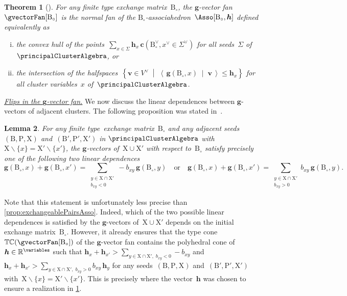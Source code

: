 \documentclass{amsart}
\newtheorem{theorem}{Theorem}[section]
\newtheorem{lemma}[theorem]{Lemma}
\theoremstyle{definition}
\newcommand{\R}{\mathbb{R}} %
\renewcommand{\b}[1]{{\boldsymbol{#1}}} %
\newcommand{\set}[2]{\left\{ #1 \;\middle|\; #2 \right\}} %
\newcommand{\ssm}{\smallsetminus} %
\newcommand{\dotprod}[2]{\left\langle \, #1 \; \middle| \; #2 \, \right\rangle} %
\newcommand{\darkblue}{\color{darkblue}} %
\newcommand{\defn}[1]{\textsl{\darkblue #1}} %
\newcommand{\para}[1]{\medskip\noindent\uline{\textit{#1.}}} %
\newcommand{\gvectorFull}[2]{\b{g}(#1,#2)} %
\newcommand{\cvectorFull}[3]{\mathbf{c}(#1,#3 \in #2)} %
\newcommand{\typeCone}{\mathbb{TC}} %
\newcommand{\seed}{\Sigma} %
\newcommand{\cluster}{\mathrm{X}} %
\newcommand{\coefficients}{\mathrm{P}} %
\newcommand{\B}{\mathrm{B}} %
\begin{document}
\begin{theorem}[{\cite[Thm.~26]{HohlwegPilaudStella}}]
\label{thm:generalizedAsso}
For any finite type exchange matrix~$\B_\circ$, the $\b{g}$-vector fan~$\gvectorFan[\B_\circ]$ is the normal fan of the \defn{$\B_\circ$-associahedron}~$\Asso[\B_\circ, \b{h}]$ defined equivalently as
\begin{enumerate}[(i)]
\item the convex hull of the points~$\sum_{x \in \seed} \b{h}_x \, \cvectorFull{\B_\circ^\vee}{\seed^\vee}{x^\vee}$ for all seeds~$\seed$ of~$\principalClusterAlgebra$, or
\item the intersection of the halfspaces~$\set{\b{v} \in V^\vee}{\dotprod{\gvectorFull{\B_\circ}{x}}{\b{v}} \le \b{h}_x}$ for all cluster variables~$x$ of~$\principalClusterAlgebra$.
\end{enumerate}
\end{theorem}

\para{Flips in the $\b{g}$-vector fan}
%
We now discuss the linear dependences between $\b{g}$-vectors of adjacent clusters.
The following proposition was stated in~\cite[Lem.~19]{HohlwegPilaudStella}.

\begin{lemma}
\label{lem:linearDependencegvectorsCA}
For any finite type~exchange matrix~$\B_\circ$ and any adjacent seeds~${(\B, \coefficients, \cluster)}$ and~${(\B', \coefficients', \cluster')}$ in $\principalClusterAlgebra$ with~$\cluster \ssm \{x\} = \cluster' \ssm \{x'\}$, the $\b{g}$-vectors of~$\cluster \cup \cluster'$ with respect to~$\B_\circ$ satisfy precisely one of the following two linear dependences
\[
\gvectorFull{\B_\circ}{x} + \gvectorFull{\B_\circ}{x'} = \sum_{\substack{y \in \cluster \cap \cluster' \\ b_{xy} < 0}} -b_{xy} \, \gvectorFull{\B_\circ}{y}
\quad\text{or}\quad
\gvectorFull{\B_\circ}{x} + \gvectorFull{\B_\circ}{x'} = \sum_{\substack{y \in \cluster \cap \cluster' \\ b_{xy} > 0}} b_{xy} \, \gvectorFull{\B_\circ}{y}.
\]
\end{lemma}

Note that this statement is unfortunately less precise than \cref{prop:exchangeablePairsAsso}. Indeed, which of the two possible linear dependences is satisfied by the $\b{g}$-vectors of~$\cluster \cup \cluster'$ depends on the initial exchange matrix~$\B_\circ$.
However, it already ensures that the type cone~$\typeCone(\gvectorFan[\B_\circ])$ of the $\b{g}$-vector fan contains the polyhedral cone of~$\b{h} \in \R^{\variables}$ such that
\(
\b{h}_x + \b{h}_{x'} > \sum_{{y \in \cluster \cap \cluster', \; b_{xy} < 0}} -b_{xy}
\)
and
\(
\b{h}_x + \b{h}_{x'} > \sum_{{y \in \cluster \cap \cluster', \; b_{xy} > 0}} b_{xy} \, \b{h}_y
\)
for any seeds~$(\B, \coefficients, \cluster)$ and~$(\B', \coefficients', \cluster')$ with~${\cluster \ssm \{x\} = \cluster' \ssm \{x'\}}$.
This is precisely where the vector~$\b{h}$ was chosen to ensure a realization in \cref{thm:generalizedAsso}.
\end{document}
